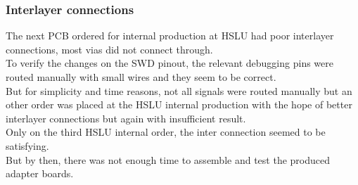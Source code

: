 \subsubsection{Interlayer connections}
The next PCB ordered for internal production at HSLU had poor interlayer connections, most vias did not connect through.\\
To verify the changes on the SWD pinout, the relevant debugging pins were routed manually with small wires and they seem to be correct.\\
But for simplicity and time reasons, not all signals were routed manually but an other order was placed at the HSLU internal production with the hope of better interlayer connections but again with insufficient result.\\
Only on the third HSLU internal order, the inter connection seemed to be satisfying.\\
But by then, there was not enough time to assemble and test the produced adapter boards.\\
%
%
%
%
%
%
%